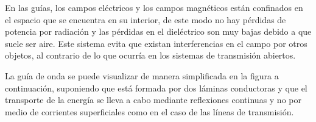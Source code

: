 \documentclass[a4paper]{article}
\begin{document}
\noindent{}

En las guías, los campos eléctricos y los campos magnéticos están
confinados en el espacio que se encuentra en su interior, de este modo
no hay pérdidas de potencia por radiación y las pérdidas en el
dieléctrico son muy bajas debido a que suele ser aire. Este sistema
evita que existan interferencias en el campo por otros objetos, al
contrario de lo que ocurría en los sistemas de transmisión abiertos.

La guía de onda se puede visualizar de manera simplificada en la figura
a continuación, suponiendo que está formada por dos láminas conductoras
y que el transporte de la energía se lleva a cabo mediante reflexiones
continuas y no por medio de corrientes superficiales como en el caso de
las líneas de transmisión.

\noindent{}
\end{document}
